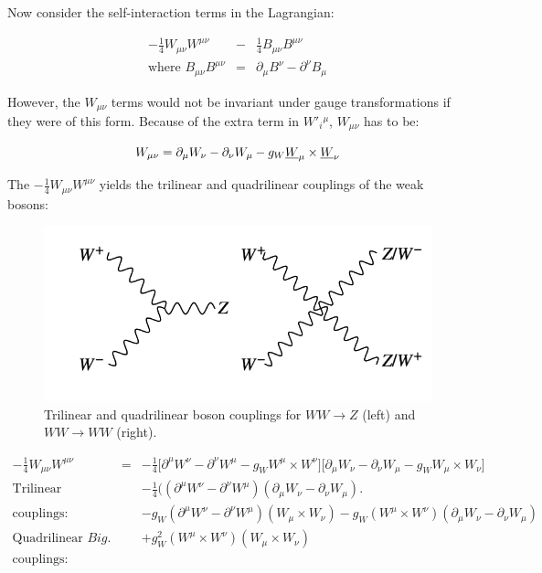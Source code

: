 Now consider the self-interaction terms in the Lagrangian:

\begin{eqnarray*}
  -\frac{1}{4}W_{\mu\nu}W^{\mu\nu} & - & \frac{1}{4}B_{\mu\nu}B^{\mu\nu} \\
  \textrm{where } B_{\mu\nu}B^{\mu\nu} & = & \partial_{\mu}B^{\nu} - \partial^{\nu}B_{\mu}
\end{eqnarray*}

However, the $W_{\mu\nu}$ terms would not be invariant under gauge transformations if they were of this form.  Because of the extra term in $W'_i{}^{\mu}$, $W_{\mu\nu}$ has to be:

\[
  W_{\mu\nu} = \partial_{\mu}W_{\nu} - \partial_{\nu}W_{\mu} - g_W \underline{W}_{\mu}\times\underline{W}_{\nu}
\]

The $-\frac{1}{4}W_{\mu\nu}W^{\mu\nu}$ yields the trilinear and quadrilinear couplings of the weak bosons:

\begin{figure}[!htb]
  \begin{center}
    \includegraphics[width=\textwidth]{images/web_feynman/image_77.png}
    \caption[Trilinear and quadrilinear boson couplings]{Trilinear and quadrilinear boson couplings for $WW\to Z$ (left) and $WW\to WW$ (right).}
    \label{fig:ch15_vectorBosonScattering}
  \end{center}
\end{figure}

\begin{eqnarray*}
  -\frac{1}{4}W_{\mu\nu}W^{\mu\nu} & = & -\frac{1}{4} \Big[\partial^{\mu}W^{\nu} - \partial^{\nu}W^{\mu} - g_W W^{\mu}\times W^{\nu}\Big]\Big[\partial_{\mu}W_{\nu} - \partial_{\nu}W_{\mu} - g_W W_{\mu}\times W_{\nu}\Big] \\
  \textrm{Trilinear } & & -\frac{1}{4}\Big( \left(\partial^{\mu}W^{\nu} - \partial^{\nu}W^{\mu}\right)\left(\partial_{\mu}W_{\nu} - \partial_{\nu}W_{\mu}\right)\Big. \\
  \textrm{couplings: } & & -g_W\left(\partial^{\mu}W^{\nu} - \partial^{\nu}W^{\mu}\right)\left(W_{\mu}\times W_{\nu}\right) -g_W\left(W^{\mu}\times W^{\nu}\right)\left(\partial_{\mu}W_{\nu} - \partial_{\nu}W_{\mu}\right) \\
  \textrm{Quadrilinear } Big. & & + g_W^2\left(W^{\mu}\times W^{\nu}\right)\left(W_{\mu}\times W_{\nu}\right) \\
  \textrm{couplings: } & &
\end{eqnarray*}

